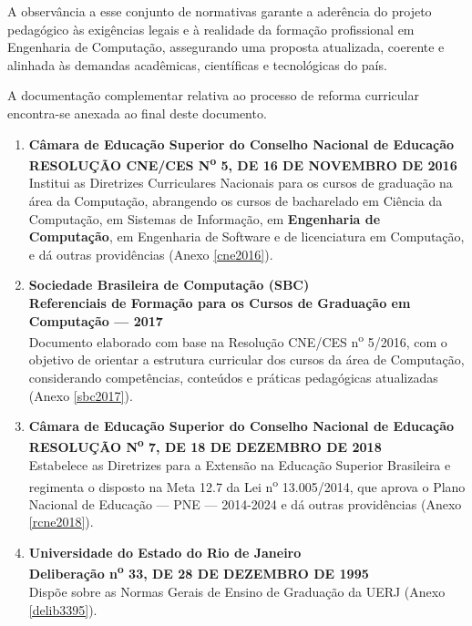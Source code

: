 A observância a esse conjunto de normativas garante a aderência do projeto pedagógico às exigências legais e à realidade da formação profissional em Engenharia de Computação, assegurando uma proposta atualizada, coerente e alinhada às demandas acadêmicas, científicas e tecnológicas do país.

A documentação complementar relativa ao processo de reforma curricular encontra-se anexada ao final deste documento.

\begin{enumerate}
    \item \textbf{Câmara de Educação Superior do Conselho Nacional de Educação}  \\
          \textbf{RESOLUÇÃO CNE/CES N\textsuperscript{o} 5, DE 16 DE NOVEMBRO DE 2016}  \\
          Institui as Diretrizes Curriculares Nacionais para os cursos de graduação na área da Computação, abrangendo os cursos de bacharelado em Ciência da Computação, em Sistemas de Informação, em \textbf{Engenharia de Computação}, em Engenharia de Software e de licenciatura em Computação, e dá outras providências (Anexo \ref{cne2016}).

    \item \textbf{Sociedade Brasileira de Computação (SBC)}  \\
          \textbf{Referenciais de Formação para os Cursos de Graduação em Computação –-- 2017} \\
          Documento elaborado com base na Resolução CNE/CES n\textsuperscript{o} 5/2016, com o objetivo de orientar a estrutura curricular dos cursos da área de Computação, considerando competências, conteúdos e práticas pedagógicas atualizadas (Anexo \ref{sbc2017}).

    \item \textbf{Câmara de Educação Superior do Conselho Nacional de Educação}  \\
          \textbf{RESOLUÇÃO N\textsuperscript{o} 7, DE 18 DE DEZEMBRO DE 2018}  \\
          Estabelece as Diretrizes para a Extensão na Educação Superior Brasileira e regimenta o disposto na Meta 12.7 da Lei n\textsuperscript{o} 13.005/2014, que aprova o Plano Nacional de Educação –-- PNE –-- 2014-2024 e dá outras providências (Anexo \ref{rcne2018}).

    \item \textbf{Universidade do Estado do Rio de Janeiro}  \\
          \textbf{Deliberação n\textsuperscript{o} 33, DE 28 DE DEZEMBRO DE 1995}  \\
          Dispõe sobre as Normas Gerais de Ensino de Graduação da UERJ (Anexo \ref{delib3395}).


\end{enumerate}
